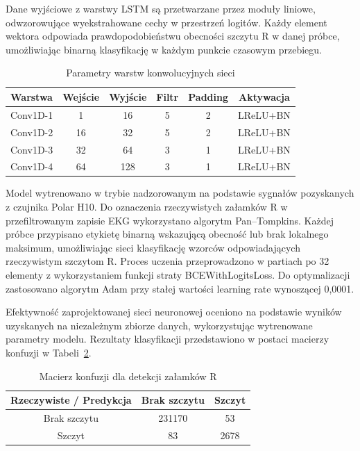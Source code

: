 \documentclass[journal]{IEEEtran}
\begin{document}
\newpage
Dane wyjściowe z warstwy LSTM są przetwarzane przez moduły liniowe, odwzorowujące wyekstrahowane cechy w przestrzeń logitów. Każdy element wektora odpowiada prawdopodobieństwu obecności szczytu R w danej próbce, umożliwiając binarną klasyfikację w każdym punkcie czasowym przebiegu.


\begin{table}[h!]
\centering
\caption{Parametry warstw konwolucyjnych sieci}
\label{tab:conv_layers}
\begin{tabular}{|l|c|c|c|c|c|}
\hline
\textbf{Warstwa} & \textbf{Wejście} & \textbf{Wyjście} & \textbf{Filtr} & \textbf{Padding} & \textbf{Aktywacja} \\
\hline
Conv1D-1 & 1   & 16  & 5 & 2 & LReLU+BN \\
Conv1D-2 & 16  & 32  & 5 & 2 & LReLU+BN \\
Conv1D-3 & 32  & 64  & 3 & 1 & LReLU+BN \\
Conv1D-4 & 64  & 128 & 3 & 1 & LReLU+BN \\
\hline
\end{tabular}
\end{table}

Model wytrenowano w trybie nadzorowanym na podstawie sygnałów pozyskanych z czujnika Polar H10. Do oznaczenia rzeczywistych załamków R w przefiltrowanym zapisie EKG wykorzystano algorytm Pan–Tompkins. Każdej próbce przypisano etykietę binarną wskazującą obecność lub brak lokalnego maksimum, umożliwiając sieci klasyfikację wzorców odpowiadających rzeczywistym szczytom R. Proces uczenia przeprowadzono w partiach po 32 elementy z wykorzystaniem funkcji straty BCEWithLogitsLoss. Do optymalizacji zastosowano algorytm Adam przy stałej wartości learning rate wynoszącej 0,0001.

Efektywność zaprojektowanej sieci neuronowej oceniono na podstawie wyników uzyskanych na niezależnym zbiorze danych, wykorzystując wytrenowane parametry modelu. Rezultaty klasyfikacji przedstawiono w postaci macierzy konfuzji w Tabeli~\ref{tab:conf_matrix}.

\begin{table}[ht]
\centering
\caption{Macierz konfuzji dla detekcji załamków R}
\label{tab:conf_matrix}
\begin{tabular}{|c|c|c|}
\hline
\textbf{Rzeczywiste / Predykcja} & \textbf{Brak szczytu } & \textbf{Szczyt } \\
\hline
Brak szczytu  & 231170 & 53 \\
\hline
Szczyt  & 83 & 2678 \\
\hline
\end{tabular}
\end{table}
\end{document}
